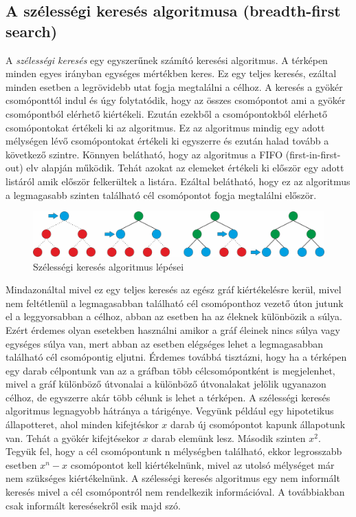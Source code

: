 \subsection{A szélességi keresés algoritmusa (breadth-first search)}
A \textit{szélességi keresés} egy egyszerűnek számító keresési algoritmus. A térképen minden egyes irányban egységes mértékben keres. Ez egy teljes keresés, ezáltal minden esetben a legrövidebb utat fogja megtalálni a célhoz. A keresés a gyökér csomóponttól indul és úgy folytatódik, hogy az összes csomópontot ami a gyökér csomópontból elérhető kiértékeli. Ezután ezekből a csomópontokból elérhető csomópontokat értékeli ki az algoritmus. Ez az algoritmus mindig egy adott mélységen lévő csomópontokat értékeli ki egyszerre és ezután halad tovább a következő szintre. Könnyen belátható, hogy az algoritmus a FIFO (first-in-first-out) elv alapján működik. Tehát azokat az elemeket értékeli ki először egy adott listáról amik először felkerültek a listára. Ezáltal belátható, hogy ez az algoritmus a legmagasabb szinten található cél csomópontot fogja megtalálni először. 

\begin{figure}[h!]
\centering
\includegraphics[scale=0.4]{kepek/breadth-first_search.jpg}
\caption{Szélességi keresés algoritmus lépései}
\label{fig:breadth-first_search}
\end{figure}

\noindent Mindazonáltal mivel ez egy teljes keresés az egész gráf kiértékelésre kerül, mivel nem feltétlenül a legmagasabban található cél csomóponthoz vezető úton jutunk el a leggyorsabban a célhoz, abban az esetben ha az éleknek különbözik a súlya. Ezért érdemes olyan esetekben használni amikor a gráf éleinek nincs súlya vagy egységes súlya van, mert abban az esetben elégséges lehet a legmagasabban található cél csomópontig eljutni.  Érdemes továbbá tisztázni, hogy ha a térképen egy darab célpontunk van az a gráfban több célcsomópontként is megjelenhet, mivel a gráf különböző útvonalai a különböző útvonalakat jelölik ugyanazon célhoz, de egyszerre akár több célunk is lehet a térképen.
\newline
\newline A szélességi keresés algoritmus legnagyobb hátránya a tárigénye. Vegyünk például egy hipotetikus állapotteret, ahol minden kifejtéskor $x$ darab új csomópontot kapunk állapotunk van. Tehát a gyökér kifejtésekor $x$ darab elemünk lesz. Második szinten $x^2$. Tegyük fel, hogy a cél csomópontunk n mélységben található, ekkor legrosszabb esetben $x^n - x$ csomópontot kell kiértékelnünk, mivel az utolsó mélységet már nem szükséges kiértékelnünk. 
\newline
\newline A szélességi keresés algoritmus egy nem informált keresés mivel a cél csomópontról nem rendelkezik információval. A továbbiakban csak informált keresésekről esik majd szó.

